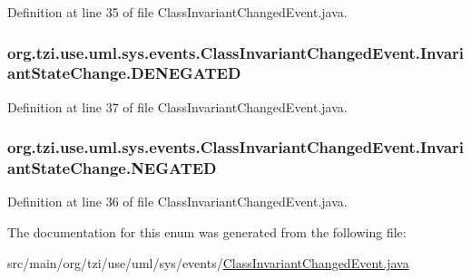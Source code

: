 Definition at line 35 of file Class\-Invariant\-Changed\-Event.\-java.

\hypertarget{enumorg_1_1tzi_1_1use_1_1uml_1_1sys_1_1events_1_1_class_invariant_changed_event_1_1_invariant_state_change_a9201e2f635f73e9deb624f5354bfc18b}{
\subsubsection[{D\-E\-N\-E\-G\-A\-T\-E\-D}]{\setlength{\rightskip}{0pt plus 5cm}org.\-tzi.\-use.\-uml.\-sys.\-events.\-Class\-Invariant\-Changed\-Event.\-Invariant\-State\-Change.\-D\-E\-N\-E\-G\-A\-T\-E\-D}}\label{enumorg_1_1tzi_1_1use_1_1uml_1_1sys_1_1events_1_1_class_invariant_changed_event_1_1_invariant_state_change_a9201e2f635f73e9deb624f5354bfc18b}


Definition at line 37 of file Class\-Invariant\-Changed\-Event.\-java.

\hypertarget{enumorg_1_1tzi_1_1use_1_1uml_1_1sys_1_1events_1_1_class_invariant_changed_event_1_1_invariant_state_change_aa54a3a849da4699a4e3f1cabc64a9562}{
\subsubsection[{N\-E\-G\-A\-T\-E\-D}]{\setlength{\rightskip}{0pt plus 5cm}org.\-tzi.\-use.\-uml.\-sys.\-events.\-Class\-Invariant\-Changed\-Event.\-Invariant\-State\-Change.\-N\-E\-G\-A\-T\-E\-D}}\label{enumorg_1_1tzi_1_1use_1_1uml_1_1sys_1_1events_1_1_class_invariant_changed_event_1_1_invariant_state_change_aa54a3a849da4699a4e3f1cabc64a9562}


Definition at line 36 of file Class\-Invariant\-Changed\-Event.\-java.



The documentation for this enum was generated from the following file\-:\begin{DoxyCompactItemize}
\item 
src/main/org/tzi/use/uml/sys/events/\hyperlink{_class_invariant_changed_event_8java}{Class\-Invariant\-Changed\-Event.\-java}\end{DoxyCompactItemize}
